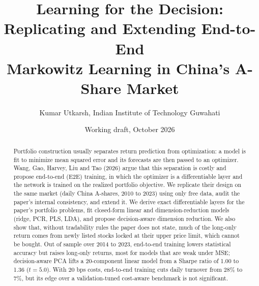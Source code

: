 \documentclass[10pt,a4paper]{article}
\title{\vspace{-2.4em}\large\textbf{Learning for the Decision: Replicating and Extending End-to-End\\Markowitz Learning in China's A-Share Market}}
\author{\normalsize Kumar Utkarsh, Indian Institute of Technology Guwahati}
\date{\small Working draft, October 2026\vspace{-1.2em}}
\begin{document}
\maketitle
\vspace{-1.2em}

\begin{abstract}
\noindent Portfolio construction usually separates return prediction from optimization: a model is fit to
minimize mean squared error and its forecasts are then passed to an optimizer. Wang, Gao, Harvey, Liu and Tao
(2026) argue that this separation is costly and propose end-to-end (E2E) training, in which the optimizer is a
differentiable layer and the network is trained on the realized portfolio objective. We replicate their design on
the same market (daily China A-shares, 2010 to 2023) using only free data, audit the paper's internal
consistency, and extend it. We derive exact differentiable layers for the paper's portfolio problems, fit
closed-form linear and dimension-reduction models (ridge, PCR, PLS, LDA), and propose decision-aware dimension
reduction. We also show that, without tradability rules the paper does not state, much of the long-only
return comes from newly listed stocks locked at their upper price limit, which cannot be bought. Out of sample
over 2014 to 2023, end-to-end training lowers statistical accuracy but raises long-only returns, most for models
that are weak under MSE; decision-aware PCA lifts a 20-component linear model from a Sharpe ratio of 1.00 to 1.36
($t=5.0$). With 20 bps costs, end-to-end training cuts daily turnover from 28\% to 7\%, but its edge over a
validation-tuned cost-aware benchmark is not significant.
\end{abstract}
\end{document}
